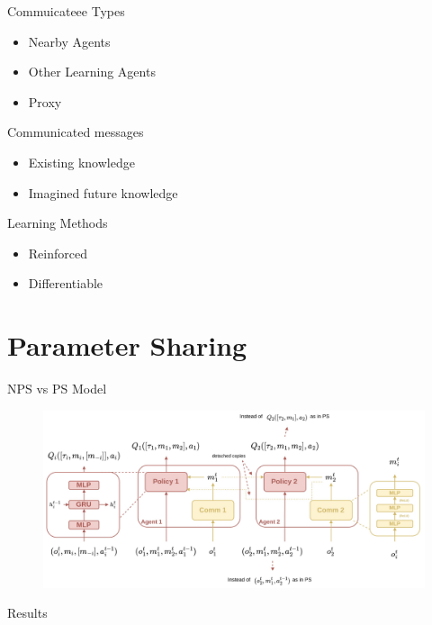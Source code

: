 \documentclass{beamer}
\begin{document}
\begin{frame}{Commuicateee Types}
\begin{itemize}
	\item Nearby Agents
	\item Other Learning Agents
	\item Proxy
\end{itemize}
\end{frame}

\begin{frame}{Communicated messages}
\begin{itemize}
	\item Existing knowledge
	\item Imagined future knowledge
\end{itemize}
\end{frame}

\begin{frame}{Learning Methods}
\begin{itemize}
	\item Reinforced
	\item Differentiable
\end{itemize}
\end{frame}

\section{Parameter Sharing}

\begin{frame}{NPS vs PS Model}
	\begin{figure}
		\centering
		\includegraphics[scale=0.25]{images/nps_comm.png}
	\end{figure}
\end{frame}

\begin{frame}{Results}
	
\end{frame}
\end{document}
